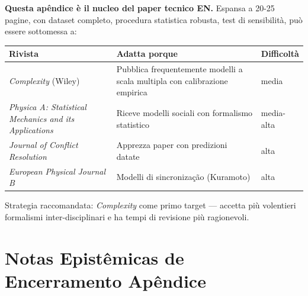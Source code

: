 \Hypoth{} \textbf{Questa apêndice è il nucleo del paper tecnico EN.}
Espansa a 20-25 pagine, con dataset completo, procedura statistica
robusta, test di sensibilità, può essere sottomessa a:

{\def\LTcaptype{none} %
{\small\begin{longtable}[]{@{}
  >{\raggedright\arraybackslash}p{}
  >{\raggedright\arraybackslash}p{}
  >{\raggedright\arraybackslash}p{}@{}}
\toprule\noalign{}
\begin{minipage}[b]{\linewidth}\raggedright
Rivista
\end{minipage} & \begin{minipage}[b]{\linewidth}\raggedright
Adatta porque
\end{minipage} & \begin{minipage}[b]{\linewidth}\raggedright
Difficoltà
\end{minipage} \\
\midrule\noalign{}
\endhead
\bottomrule\noalign{}
\endlastfoot
\emph{Complexity} (Wiley) & Pubblica frequentemente modelli a scala
multipla con calibrazione empirica & media \\
\emph{Physica A: Statistical Mechanics and its Applications} & Riceve
modelli sociali con formalismo statistico & media-alta \\
\emph{Journal of Conflict Resolution} & Apprezza paper con predizioni
datate & alta \\
\emph{European Physical Journal B} & Modelli di sincronização
(Kuramoto) & alta \\
\end{longtable}}
}

Strategia raccomandata: \emph{Complexity} come primo target --- accetta
più volentieri formalismi inter-disciplinari e ha tempi di revisione più
ragionevoli.



\section{Notas Epistêmicas de Encerramento
Apêndice}\label{note-epistemiche-di-chiusura-apêndice}

